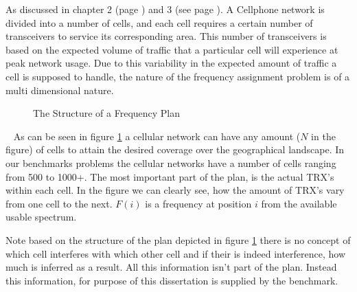 As discussed in chapter 2 (page \pageref{chpt:celltech}) and 3 (see page \pageref{chpt:fap}). A Cellphone network is divided into a number of cells, and each cell requires a certain number of transceivers to service its corresponding
area. This number of transceivers is based on the expected volume of traffic that a particular cell will experience at peak network usage. Due to this variability in the expected amount of traffic a cell is supposed to handle, the nature
of the frequency assignment problem is of a multi dimensional nature.
~
~
\begin{figure}[ht]
	\centering
	\setlength \fboxsep{0pt}
	\setlength \fboxrule{0.5pt}
	\caption{The Structure of a Frequency Plan}
	\label{fig:fapPlan}
\end{figure}
~
As can be seen in figure \ref{fig:fapPlan} a cellular network can have any amount ($N$ in the figure) of cells to attain the desired coverage over the geographical landscape. In our benchmarks problems the cellular networks have a number of
cells ranging from 500 to 1000+. The most important part of the plan, is the actual TRX's within each cell. In the figure we can clearly see, how the amount of TRX's vary from one cell to the next. $F(i)$ is a frequency at position $i$ from
the available usable spectrum. 

Note based on the structure of the plan depicted in figure \ref{fig:fapPlan} there is no concept of which cell interferes with which other cell and if their is indeed interference, how much is inferred as a result. All this information isn't part
of the plan. Instead this information, for purpose of this dissertation is supplied by the benchmark. 

